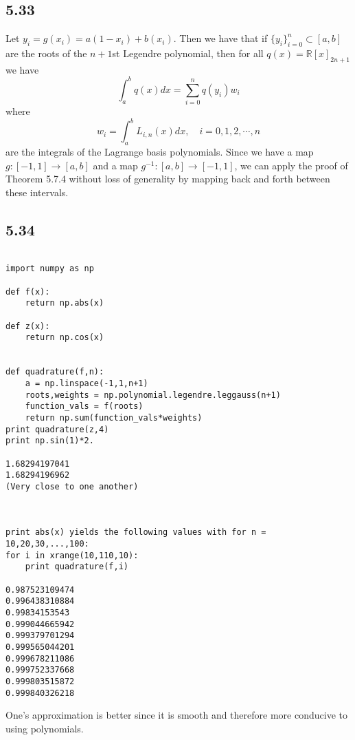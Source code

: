\documentclass[letterpaper,12pt]{article}
\theoremstyle{definition}
\begin{document}
\subsection*{5.33}
Let $y_i = g(x_i) =  a(1-x_i) + b(x_i)$. Then we have that if $\{y_i\}_{i = 0}^n \subset [a,b]$ are the roots of the $n+1$st Legendre polynomial, then for all $q(x) = \mathbb{R}[x]_{2n+1}$ we have 
\[ \int^{b}_{a} q(x) dx = \sum^{n}_{i=0} q(y_i)w_i\]
where
\[w_i = \int^{b}_{a} L_{i,n}(x) dx, \quad i = 0,1,2,\cdots,n \]
are the integrals of the Lagrange basis polynomials. Since we have a map $g:[-1,1] \to [a,b]$ and a map $g^{-1}: [a,b]\to [-1,1] $, we can apply the proof of Theorem 5.7.4 without loss of generality by mapping back and forth between these intervals. 

\subsection*{5.34}

\begin{lstlisting}

import numpy as np

def f(x):
    return np.abs(x)

def z(x):
    return np.cos(x)


def quadrature(f,n):
    a = np.linspace(-1,1,n+1)
    roots,weights = np.polynomial.legendre.leggauss(n+1)
    function_vals = f(roots)
    return np.sum(function_vals*weights)
print quadrature(z,4)
print np.sin(1)*2.

1.68294197041
1.68294196962
(Very close to one another)



print abs(x) yields the following values with for n = 10,20,30,...,100:
for i in xrange(10,110,10):
    print quadrature(f,i)

0.987523109474
0.996438310884
0.99834153543
0.999044665942
0.999379701294
0.999565044201
0.999678211086
0.999752337668
0.999803515872
0.999840326218

\end{lstlisting}
One's approximation is better since it is smooth and therefore more conducive to using polynomials.
\end{document}
